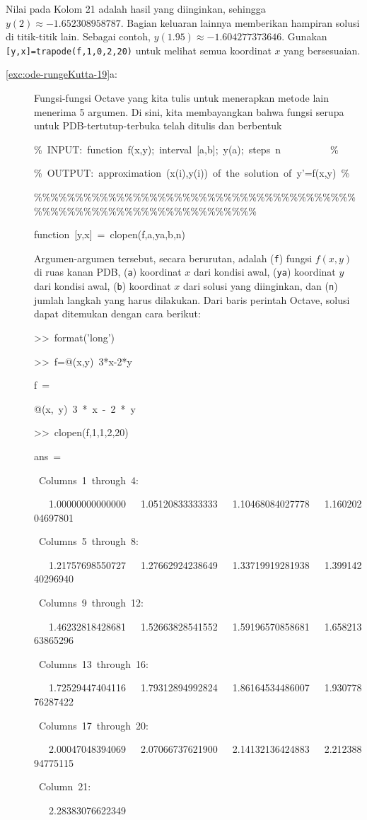 Nilai pada Kolom 21 adalah hasil yang diinginkan, sehingga $y(2)\approx-1.652308958787$.
Bagian keluaran lainnya memberikan hampiran solusi di titik-titik
lain. Sebagai contoh, $y(1.95)\approx-1.604277373646$. Gunakan \texttt{{[}y,x{]}=trapode(f,1,0,2,20)}
untuk melihat semua koordinat $x$ yang bersesuaian.
\begin{description}
\item [{\ref{exc:ode-rungeKutta-19}a:}] Fungsi-fungsi Octave yang kita
tulis untuk menerapkan metode lain menerima 5 argumen. Di sini, kita
membayangkan bahwa fungsi serupa untuk PDB-tertutup-terbuka telah
ditulis dan berbentuk

\begin{lyxcode}
\%~INPUT:~function~f(x,y);~interval~{[}a,b{]};~y(a);~steps~n~~~~~~~~~~\%

\%~OUTPUT:~approximation~(x(i),y(i))~of~the~solution~of~y'=f(x,y)~\%

\%\%\%\%\%\%\%\%\%\%\%\%\%\%\%\%\%\%\%\%\%\%\%\%\%\%\%\%\%\%\%\%\%\%\%\%\%\%\%\%\%\%\%\%\%\%\%\%\%\%\%\%\%\%\%\%\%\%\%\%\%\%\%\%\%\%

function~{[}y,x{]}~=~clopen(f,a,ya,b,n)~
\end{lyxcode}
Argumen-argumen tersebut, secara berurutan, adalah (\texttt{f}) fungsi
$f(x,y)$ di ruas kanan PDB, (\texttt{a}) koordinat $x$ dari kondisi
awal, (\texttt{ya}) koordinat $y$ dari kondisi awal, (\texttt{b})
koordinat $x$ dari solusi yang diinginkan, dan (\texttt{n}) jumlah
langkah yang harus dilakukan. Dari baris perintah Octave, solusi dapat
ditemukan dengan cara berikut:
\begin{lyxcode}
>\textcompwordmark >~format('long')

>\textcompwordmark >~f=@(x,y)~3{*}x-2{*}y

f~=

@(x,~y)~3~{*}~x~-~2~{*}~y

>\textcompwordmark >~clopen(f,1,1,2,20)

ans~=

~Columns~1~through~4:

~~~1.00000000000000~~~1.05120833333333~~~1.10468084027778~~~1.16020204697801

~Columns~5~through~8:

~~~1.21757698550727~~~1.27662924238649~~~1.33719919281938~~~1.39914240296940

~Columns~9~through~12:

~~~1.46232818428681~~~1.52663828541552~~~1.59196570858681~~~1.65821363865296

~Columns~13~through~16:

~~~1.72529447404116~~~1.79312894992824~~~1.86164534486007~~~1.93077876287422

~Columns~17~through~20:

~~~2.00047048394069~~~2.07066737621900~~~2.14132136424883~~~2.21238894775115

~Column~21:

~~~2.28383076622349
\end{lyxcode}
\end{description}
